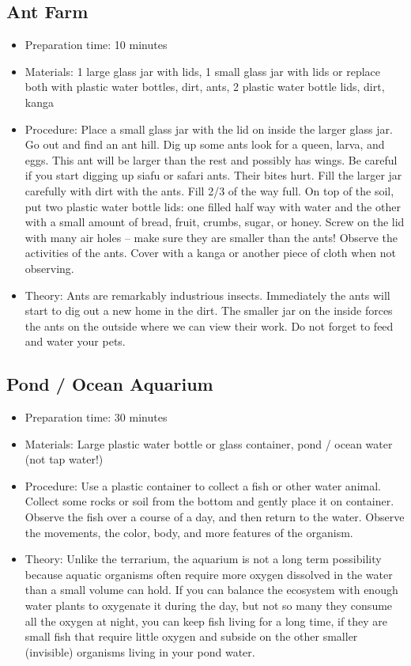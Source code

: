 \subsection{Ant Farm}
\begin{itemize}
\item{Preparation time: 10 minutes}
\item{Materials: 1 large glass jar with lids, 1 small glass jar with lids or replace both with plastic water bottles, dirt, ants, 2 plastic water bottle lids, dirt, kanga}
\item{Procedure: Place a small glass jar with the lid on inside the larger glass jar. Go out and find an ant hill. Dig up some ants look for a queen, larva, and eggs. This ant will be larger than the rest and possibly has wings. Be careful if you start digging up siafu or safari ants. Their bites hurt. Fill the larger jar carefully with dirt with the ants. Fill 2/3 of the way full. On top of the soil, put two plastic water bottle lids: one filled half way with water and the other with a small amount of bread, fruit, crumbs, sugar, or honey. Screw on the lid with many air holes – make sure they are smaller than the ants! Observe the activities of the ants. Cover with a kanga or another piece of cloth when not observing.}
\item{Theory: Ants are remarkably industrious insects. Immediately the ants will start to dig out a new home in the dirt. The smaller jar on the inside forces the ants on the outside where we can view their work. Do not forget to feed and water your pets.}
\end{itemize}

\subsection{Pond / Ocean Aquarium}
\begin{itemize}
\item{Preparation time: 30 minutes}
\item{Materials: Large plastic water bottle or glass container, pond / ocean water (not tap water!)}
\item{Procedure: Use a plastic container to collect a fish or other water animal. Collect some rocks or soil from the bottom and gently place it on container. Observe the fish over a course of a day, and then return to the water. Observe the movements, the color, body, and more features of the organism.}
\item{Theory: Unlike the terrarium, the aquarium is not a long term possibility because aquatic organisms often require more oxygen dissolved in the water than a small volume can hold. If you can balance the ecosystem with enough water plants to oxygenate it during the day, but not so many they consume all the oxygen at night, you can keep fish living for a long time, if they are small fish that require little oxygen and subside on the other smaller (invisible) organisms living in your pond water.}
\end{itemize}

